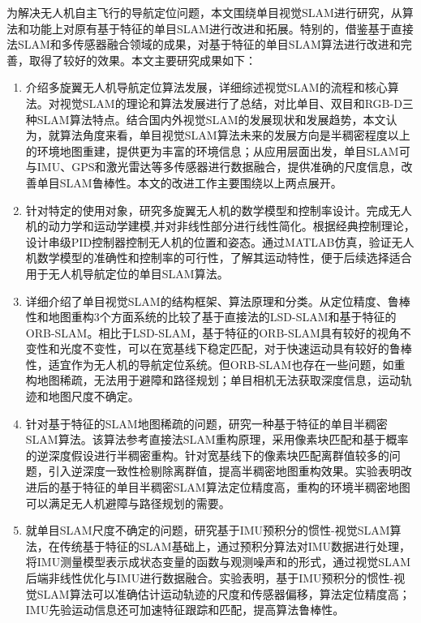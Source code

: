 


\begin{conclusion}
为解决无人机自主飞行的导航定位问题，本文围绕单目视觉SLAM进行研究，从算法和功能上对原有基于特征的单目SLAM进行改进和拓展。特别的，借鉴基于直接法SLAM和多传感器融合领域的成果，对基于特征的单目SLAM算法进行改进和完善，取得了较好的效果。本文主要研究成果如下：
\begin{enumerate}  [label={(\arabic*)}]
\item 介绍多旋翼无人机导航定位算法发展，详细综述视觉SLAM的流程和核心算法。对视觉SLAM的理论和算法发展进行了总结，对比单目、双目和RGB-D三种SLAM算法特点。结合国内外视觉SLAM的发展现状和发展趋势，本文认为，就算法角度来看，单目视觉SLAM算法未来的发展方向是半稠密程度以上的环境地图重建，提供更为丰富的环境信息；从应用层面出发，单目SLAM可与IMU、GPS和激光雷达等多传感器进行数据融合，提供准确的尺度信息，改善单目SLAM鲁棒性。本文的改进工作主要围绕以上两点展开。
\item 针对特定的使用对象，研究多旋翼无人机的数学模型和控制率设计。完成无人机的动力学和运动学建模,并对非线性部分进行线性简化。根据经典控制理论，设计串级PID控制器控制无人机的位置和姿态。通过MATLAB仿真，验证无人机数学模型的准确性和控制率的可行性，了解其运动特性，便于后续选择适合用于无人机导航定位的单目SLAM算法。
\item 详细介绍了单目视觉SLAM的结构框架、算法原理和分类。从定位精度、鲁棒性和地图重构3个方面系统的比较了基于直接法的LSD-SLAM和基于特征的ORB-SLAM。相比于LSD-SLAM，基于特征的ORB-SLAM具有较好的视角不变性和光度不变性，可以在宽基线下稳定匹配，对于快速运动具有较好的鲁棒性，适宜作为无人机的导航定位系统。但ORB-SLAM也存在一些问题，如重构地图稀疏，无法用于避障和路径规划；单目相机无法获取深度信息，运动轨迹和地图尺度不确定。
\item 针对基于特征的SLAM地图稀疏的问题，研究一种基于特征的单目半稠密SLAM算法。该算法参考直接法SLAM重构原理，采用像素块匹配和基于概率的逆深度假设进行半稠密重构。针对宽基线下的像素块匹配离群值较多的问题，引入逆深度一致性检剔除离群值，提高半稠密地图重构效果。实验表明改进后的基于特征的单目半稠密SLAM算法定位精度高，重构的环境半稠密地图可以满足无人机避障与路径规划的需要。
\item 就单目SLAM尺度不确定的问题，研究基于IMU预积分的惯性-视觉SLAM算法，在传统基于特征的SLAM基础上，通过预积分算法对IMU数据进行处理，将IMU测量模型表示成状态变量的函数与观测噪声和的形式，通过视觉SLAM后端非线性优化与IMU进行数据融合。实验表明，基于IMU预积分的惯性-视觉SLAM算法可以准确估计运动轨迹的尺度和传感器偏移，算法定位精度高；IMU先验运动信息还可加速特征跟踪和匹配，提高算法鲁棒性。
\end{enumerate}


\end{conclusion}

